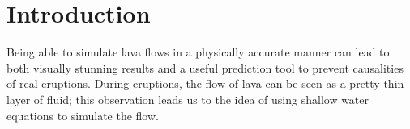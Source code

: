 \section{Introduction}

Being able to simulate lava flows in a physically accurate manner can lead to both visually stunning results and a useful prediction tool to prevent causalities of real eruptions. During eruptions, the flow of lava can be seen as a pretty thin layer of fluid; this observation leads us to the idea of using shallow water equations\cite{Solenthaler2011SPHBS} to simulate the flow.